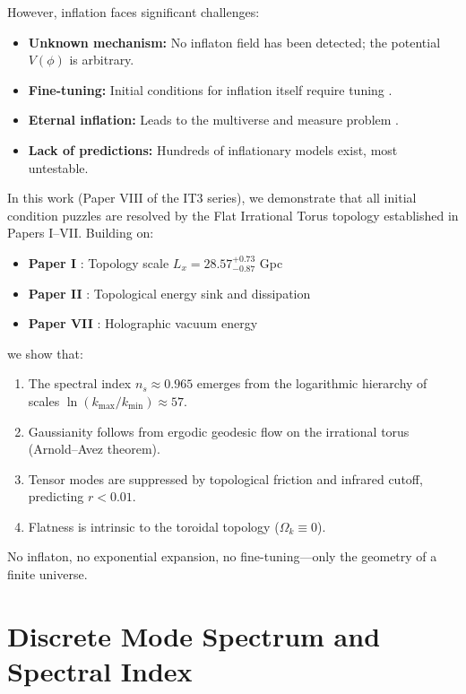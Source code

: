 \documentclass[12pt,a4paper]{article}
\begin{document}
However, inflation faces significant challenges:
\begin{itemize}
    \item \textbf{Unknown mechanism:} No inflaton field has been detected; the potential $V(\phi)$ is arbitrary.
    \item \textbf{Fine-tuning:} Initial conditions for inflation itself require tuning \citep{Penrose2010}.
    \item \textbf{Eternal inflation:} Leads to the multiverse and measure problem \citep{Guth2007}.
    \item \textbf{Lack of predictions:} Hundreds of inflationary models exist, most untestable.
\end{itemize}

In this work (Paper VIII of the IT3 series), we demonstrate that all initial condition puzzles are resolved by the Flat Irrational Torus topology established in Papers I--VII. Building on:
\begin{itemize}
    \item \textbf{Paper I} \citep{Logvinovich2026a}: Topology scale $L_x = 28.57^{+0.73}_{-0.87}$ Gpc
    \item \textbf{Paper II} \citep{Logvinovich2026b}: Topological energy sink and dissipation
    \item \textbf{Paper VII} \citep{Logvinovich2026d}: Holographic vacuum energy
\end{itemize}

we show that:
\begin{enumerate}
    \item The spectral index $n_s \approx 0.965$ emerges from the logarithmic hierarchy of scales $\ln(k_{\max}/k_{\min}) \approx 57$.
    \item Gaussianity follows from ergodic geodesic flow on the irrational torus (Arnold--Avez theorem).
    \item Tensor modes are suppressed by topological friction and infrared cutoff, predicting $r < 0.01$.
    \item Flatness is intrinsic to the toroidal topology ($\Omega_k \equiv 0$).
\end{enumerate}

No inflaton, no exponential expansion, no fine-tuning---only the geometry of a finite universe.

\section{Discrete Mode Spectrum and Spectral Index}
\end{document}
